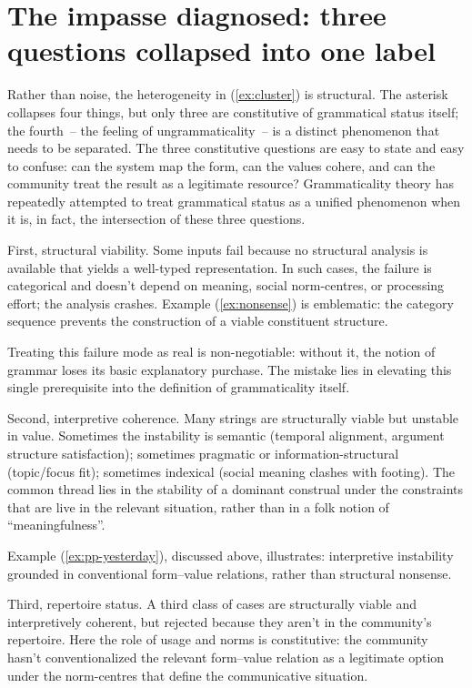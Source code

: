 \documentclass[12pt,letterpaper]{article}
\begin{document}
\section[The impasse diagnosed]{The impasse diagnosed: three questions collapsed into one label}\label{sec:impasse}

Rather than noise, the heterogeneity in (\ref{ex:cluster}) is structural. The asterisk collapses four things, but only three are constitutive of grammatical status itself; the fourth~-- the feeling of ungrammaticality~-- is a distinct phenomenon that needs to be separated. The three constitutive questions are easy to state and easy to confuse: can the system map the form, can the values cohere, and can the community treat the result as a legitimate resource? Grammaticality theory has repeatedly attempted to treat grammatical status as a unified phenomenon when it is, in fact, the intersection of these three questions.

First, structural viability. Some inputs fail because no structural analysis is available that yields a well-typed representation. In such cases, the failure is categorical and doesn't depend on meaning, social norm-centres, or processing effort; the analysis crashes. Example (\ref{ex:nonsense}) is emblematic: the category sequence prevents the construction of a viable constituent structure.

Treating this failure mode as real is non-negotiable: without it, the notion of grammar loses its basic explanatory purchase. The mistake lies in elevating this single prerequisite into the definition of grammaticality itself.

Second, interpretive coherence. Many strings are structurally viable but unstable in value. Sometimes the instability is semantic (temporal alignment, argument structure satisfaction); sometimes pragmatic or information-structural (topic/focus fit); sometimes indexical (social meaning clashes with footing). The common thread lies in the stability of a dominant construal under the constraints that are live in the relevant situation, rather than in a folk notion of \enquote{meaningfulness}.

Example (\ref{ex:pp-yesterday}), discussed above, illustrates: interpretive instability grounded in conventional form--value relations, rather than structural nonsense.

Third, repertoire status. A third class of cases are structurally viable and interpretively coherent, but rejected because they aren't in the community's repertoire. Here the role of usage and norms is constitutive: the community hasn't conventionalized the relevant form--value relation as a legitimate option under the norm-centres that define the communicative situation.
\end{document}
